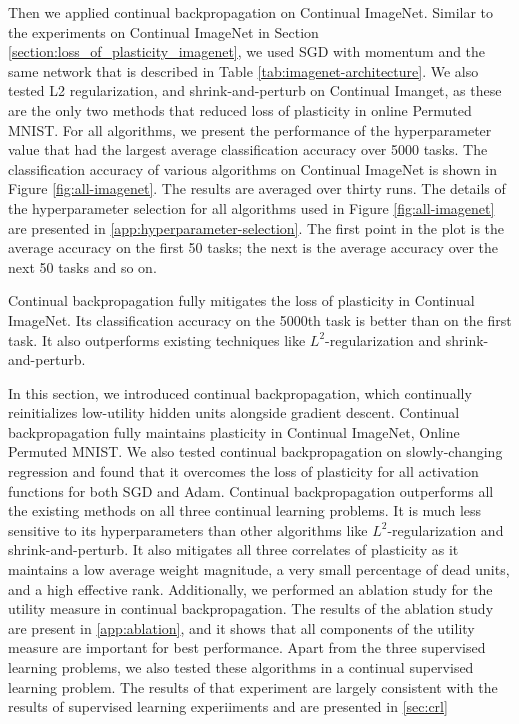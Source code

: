 \documentclass[review, number,3p]{elsarticle}
\begin{document}
Then we applied continual backpropagation on Continual ImageNet.
Similar to the experiments on Continual ImageNet in Section \ref{section:loss_of_plasticity_imagenet}, we used SGD with momentum and the same network that is described in Table \ref{tab:imagenet-architecture}.
We also tested L2 regularization, and shrink-and-perturb on Continual Imanget, as these are the only two methods that reduced loss of plasticity in online Permuted MNIST.
For all algorithms, we present the performance of the hyperparameter value  that had the largest average classification accuracy over 5000 tasks.
The classification accuracy of various algorithms on Continual ImageNet is shown in Figure \ref{fig:all-imagenet}.
The results are averaged over thirty runs. 
The details of the hyperparameter selection for all algorithms used in Figure \ref{fig:all-imagenet} are presented in \ref{app:hyperparameter-selection}.
The first point in the plot is the average accuracy on the first 50 tasks; the next is the average accuracy over the next 50 tasks and so on.


Continual backpropagation fully mitigates the loss of plasticity in Continual ImageNet.
Its classification accuracy on the 5000th task is better than on the first task. 
It also outperforms existing techniques like $L^2$-regularization and shrink-and-perturb.

In this section, we introduced continual backpropagation, which continually reinitializes low-utility hidden units alongside gradient descent.
Continual backpropagation fully maintains plasticity in Continual ImageNet, Online Permuted MNIST.
We also tested continual backpropagation on slowly-changing regression and found that it overcomes the loss of plasticity for all activation functions for both SGD and Adam. 
Continual backpropagation outperforms all the existing methods on all three continual learning problems.
It is much less sensitive to its hyperparameters than other algorithms like $L^2$-regularization and shrink-and-perturb. 
It also mitigates all three correlates of plasticity as it maintains a low average weight magnitude, a very small percentage of dead units, and a high effective rank.
Additionally, we performed an ablation study for the utility measure in continual backpropagation.
The results of the ablation study are present in \ref{app:ablation}, and it shows that all components of the utility measure are important for best performance.
Apart from the three supervised learning problems, we also tested these algorithms in a continual supervised learning problem.
The results of that experiment are largely consistent with the results of supervised learning experiiments and are presented in \ref{sec:crl}
\end{document}
